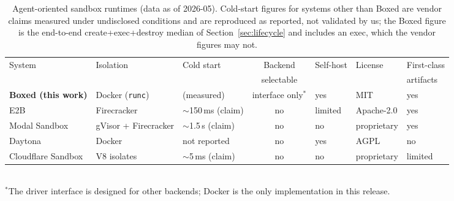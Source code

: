 \begin{table}[t]
\centering
\caption{Agent-oriented sandbox runtimes (data as of 2026-05). Cold-start
figures for systems other than Boxed are vendor claims measured under
undisclosed conditions and are reproduced as reported, not validated by us;
the Boxed figure is the end-to-end create+exec+destroy median of
Section~\ref{sec:lifecycle} and includes an exec, which the vendor figures
may not.}
\label{tab:compare}
\footnotesize
\begin{tabular}{@{}lllclll@{}}
\toprule
System & Isolation & Cold start & Backend & Self-host & License & First-class \\
       &           &            & selectable &         &         & artifacts \\
\midrule
\textbf{Boxed (this work)} & Docker (\texttt{runc}) & \BoxedColdMedian{} (measured) & interface only$^{*}$ & yes & MIT & yes \\
E2B~\cite{e2b}             & Firecracker            & $\sim$150\,ms (claim) & no  & limited & Apache-2.0 & yes \\
Modal Sandbox~\cite{modal} & gVisor + Firecracker   & $\sim$1.5\,s (claim)  & no  & no      & proprietary & yes \\
Daytona~\cite{daytona}     & Docker                 & not reported          & no  & yes     & AGPL & no \\
Cloudflare Sandbox~\cite{cfsandbox} & V8 isolates   & $\sim$5\,ms (claim)   & no & no & proprietary & limited \\
\bottomrule
\end{tabular}
\\[2pt]
{\footnotesize $^{*}$The driver interface is designed for other backends; Docker is the only implementation in this release.}
\end{table}
